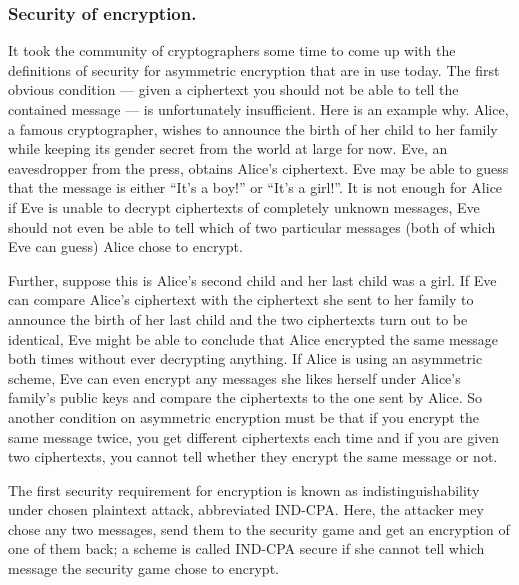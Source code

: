 \documentclass{llncs}
\begin{document}
\subsubsection{Security of encryption.}
It took the community of cryptographers some time to come up with the definitions
of security for asymmetric encryption that are in use today. The first obvious condition --- given a ciphertext you should not be able to tell the contained message --- is unfortunately insufficient. Here is an example why.
Alice, a famous cryptographer, wishes to announce the birth of her child to her family while keeping its gender secret from the world at large for now. Eve, an eavesdropper from the press, obtains Alice's ciphertext. Eve may be able to guess that the message is either ``It's a boy!'' or ``It's a girl!''. It is not enough for Alice if Eve is unable to decrypt ciphertexts of completely unknown messages, Eve should not even be able to tell which of two particular messages (both of which Eve can guess) Alice chose to encrypt.

Further, suppose this is Alice's second child and her last child was a girl. If Eve can compare Alice's ciphertext with the ciphertext she sent to her family to announce the birth of her last child and the two ciphertexts turn out to be identical, Eve might be able to conclude that Alice encrypted the same message both times without ever decrypting anything. If Alice is using an asymmetric scheme, Eve can even encrypt any messages she likes herself under Alice's family's public keys and compare the ciphertexts to the one sent by Alice. So another condition on asymmetric encryption must be that if you encrypt the same message twice, you get different ciphertexts each time and if you are given two ciphertexts, you cannot tell whether they encrypt the same message or not.

The first security requirement for encryption is known as indistinguishability
under chosen plaintext attack, abbreviated IND-CPA. Here, the attacker mey chose
any two messages, send them to the security game and get an encryption of one of
them back; a scheme is called IND-CPA secure if she cannot tell which message
the security game chose to encrypt.
\end{document}
